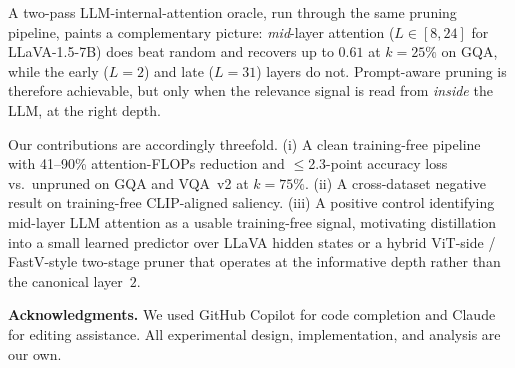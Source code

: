 \documentclass[10pt,twocolumn,letterpaper]{article}
\begin{document}
A two-pass LLM-internal-attention oracle, run through the same
pruning pipeline, paints a complementary picture: \emph{mid}-layer
attention ($L\!\in\![8,24]$ for LLaVA-1.5-7B) does beat random and
recovers up to $0.61$ at $k\!=\!25\%$ on GQA, while the early
($L\!=\!2$) and late ($L\!=\!31$) layers do not. Prompt-aware
pruning is therefore achievable, but only when the relevance signal
is read from \emph{inside} the LLM, at the right depth.

Our contributions are accordingly threefold. (i) A clean training-free
pipeline with 41--90\% attention-FLOPs reduction and
$\le$2.3-point accuracy loss vs.\ unpruned on GQA and VQA~v2 at
$k{=}75\%$. (ii) A cross-dataset negative result on training-free
CLIP-aligned saliency. (iii) A positive control identifying
mid-layer LLM attention as a usable training-free signal, motivating
distillation into a small learned predictor over LLaVA hidden states
or a hybrid ViT-side / FastV-style two-stage pruner that operates at
the informative depth rather than the canonical layer~$2$.

\noindent\textbf{Acknowledgments.}
We used GitHub Copilot for code completion and Claude for editing assistance.
All experimental design, implementation, and analysis are our own.

{\small


}
\end{document}
